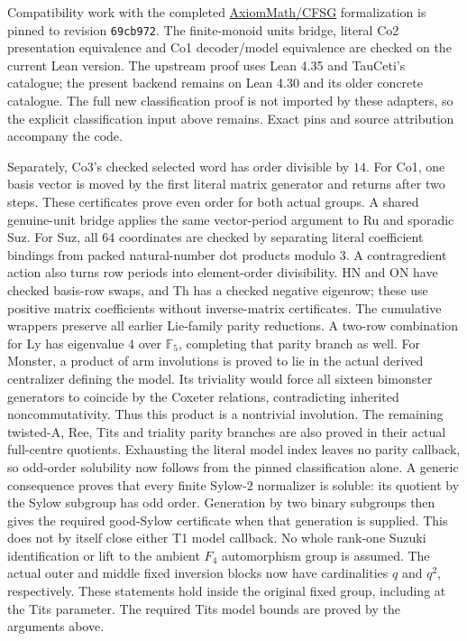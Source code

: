 Compatibility work with the completed
\href{https://github.com/AxiomMath/CFSG}{AxiomMath/CFSG} formalization is
pinned to revision \texttt{69cb972}. The finite-monoid units bridge,
literal Co2 presentation equivalence and Co1 decoder/model equivalence
are checked on the current Lean version. The upstream proof uses Lean
4.35 and TauCeti's catalogue; the present backend remains on Lean 4.30
and its older concrete catalogue. The full new classification proof is
not imported by these adapters, so the explicit classification input
above remains. Exact pins and source attribution accompany the code.

Separately, Co3's checked selected word has order divisible by $14$.
For Co1, one basis vector is moved by the first literal matrix generator
and returns after two steps. These certificates prove even order for
both actual groups. A shared genuine-unit bridge applies the same
vector-period argument to Ru and sporadic Suz. For Suz, all $64$
coordinates are checked by separating literal coefficient bindings from
packed natural-number dot products modulo $3$. A contragredient action
also turns row periods into element-order divisibility. HN and ON have
checked basis-row swaps, and Th has a checked negative eigenrow; these
use positive matrix coefficients without inverse-matrix certificates.
The cumulative wrappers preserve all earlier Lie-family parity
reductions. A two-row combination for Ly has eigenvalue $4$ over
$\mathbb F_5$, completing that parity branch as well. For Monster,
a product of arm involutions is proved to lie in the actual derived
centralizer defining the model. Its triviality would force all sixteen
bimonster generators to coincide by the Coxeter relations, contradicting
inherited noncommutativity. Thus this product is a nontrivial involution.
The remaining twisted-A, Ree, Tits and triality parity branches are
also proved in their actual full-centre quotients. Exhausting the
literal model index leaves no parity callback, so odd-order solubility
now follows from the pinned classification alone. A generic consequence
proves that every finite Sylow-$2$ normalizer is soluble: its quotient
by the Sylow subgroup has odd order. Generation by two binary
subgroups then gives the required good-Sylow certificate when that
generation is supplied. This does not by itself close either T1 model
callback.
No whole rank-one Suzuki identification or lift to the ambient $F_4$
automorphism group is assumed.
The actual outer and middle fixed inversion blocks now have cardinalities
$q$ and $q^2$, respectively. These statements hold inside the original
fixed group, including at the Tits parameter. The required Tits model
bounds are proved by the arguments above.

